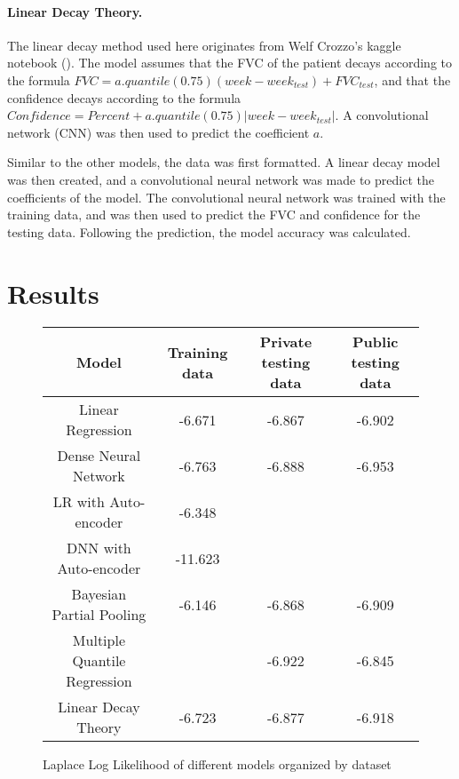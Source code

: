 \documentclass[12pt]{article}
\begin{document}
\paragraph*{Linear Decay Theory.}

The linear decay method used here originates from Welf Crozzo's kaggle notebook (\cite{lineardecay}).
The model assumes that the FVC of the patient decays according to the formula $FVC = a.quantile(0.75)(week - week_{test}) + FVC_{test}$, and that the confidence decays according to the formula $Confidence = Percent + a.quantile(0.75)|week - week_{test}|$.
A convolutional network (CNN) was then used to predict the coefficient $a$. 

Similar to the other models, the data was first formatted. 
A linear decay model was then created, and a convolutional neural network was made to predict the coefficients of the model.
The convolutional neural network was trained with the training data, and was then used to predict the FVC and confidence for the testing data.
Following the prediction, the model accuracy was calculated.

\section{Results}

\begin{figure}[h!]
    \centering
    \begin{tabular}{ | c | c | c | c | }
        \hline
        Model & Training data & Private testing data & Public testing data \\ 
        \hline
        \hline
        Linear Regression & -6.671 & -6.867 & -6.902 \\ 
        \hline 
        Dense Neural Network & -6.763 & -6.888 & -6.953 \\
        \hline
        LR with Auto-encoder & -6.348 &  &  \\
        \hline
        DNN with Auto-encoder & -11.623 &  &  \\
        \hline
        Bayesian Partial Pooling & -6.146 & -6.868 & -6.909 \\
        \hline
        Multiple Quantile Regression &  & -6.922 & -6.845 \\
        \hline
        Linear Decay Theory & -6.723 & -6.877 & -6.918 \\
        \hline
    \end{tabular}

    \caption{Laplace Log Likelihood of different models organized by dataset}
    \label{Model Performances}
\end{figure}
\end{document}
